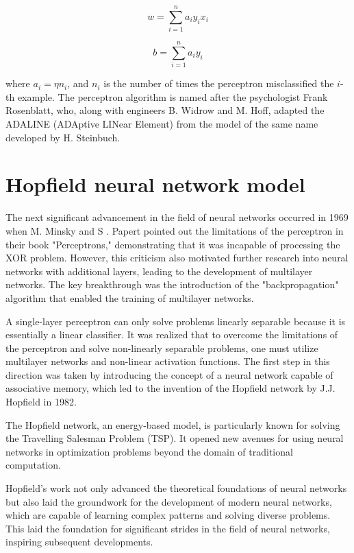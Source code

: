 \documentclass[12pt,a4paper]{report}
\begin{document}
\begin{equation}
w = \sum_{i=1}^{n} a_i y_i x_i
\end{equation}

\begin{equation}
b = \sum_{i=1}^{n} a_i y_i
\end{equation}

where \( a_i = \eta n_i \), and \( n_i \) is the number of times the perceptron misclassified the \( i \)-th example. The perceptron algorithm is named after the psychologist Frank Rosenblatt, who, along with engineers B. Widrow and M. Hoff, adapted the ADALINE (ADAptive LINear Element) from the model of the same name developed by H. Steinbuch.


\section{Hopfield neural network model}
The next significant advancement in the field of neural networks occurred in 1969 when M. Minsky and S \cite{JJHopfield1982NeuralNetworksPhysical}. Papert pointed out the limitations of the perceptron in their book "Perceptrons," demonstrating that it was incapable of processing the XOR problem. However, this criticism also motivated further research into neural networks with additional layers, leading to the development of multilayer networks. The key breakthrough was the introduction of the "backpropagation" algorithm that enabled the training of multilayer networks.

A single-layer perceptron can only solve problems linearly separable because it is essentially a linear classifier. It was realized that to overcome the limitations of the perceptron and solve non-linearly separable problems, one must utilize multilayer networks and non-linear activation functions. The first step in this direction was taken by introducing the concept of a neural network capable of associative memory, which led to the invention of the Hopfield network by J.J. Hopfield in 1982.

The Hopfield network, an energy-based model, is particularly known for solving the Travelling Salesman Problem (TSP). It opened new avenues for using neural networks in optimization problems beyond the domain of traditional computation.

Hopfield's work not only advanced the theoretical foundations of neural networks but also laid the groundwork for the development of modern neural networks, which are capable of learning complex patterns and solving diverse problems. This laid the foundation for significant strides in the field of neural networks, inspiring subsequent developments.
\end{document}
